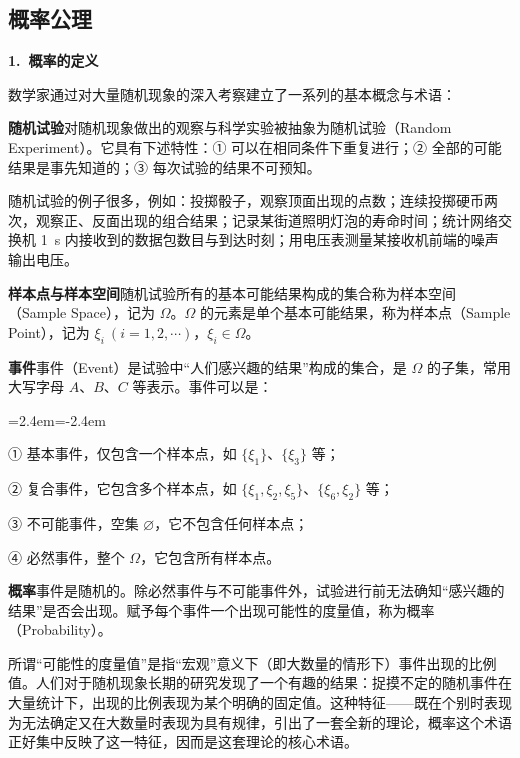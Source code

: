\documentclass[11pt,openany,UTF8]{ctexbook}
\newcommand{\bhead}[1]{\par\medskip\noindent\textbf{#1}\par\smallskip}
\newenvironment{citemize}
  {\begin{list}{}{\leftmargin=2.4em\itemindent=-2.4em\itemsep=1pt\topsep=3pt\parsep=0pt}}
  {\end{list}}
\begin{document}
\subsection{概率公理}
\bhead{1.\ 概率的定义}

数学家通过对大量随机现象的深入考察建立了一系列的基本概念与术语\nobreak：

\textbf{随机试验}\quad 对随机现象做出的观察与科学实验被抽象为随机试验（Random Experiment\nobreak）\nobreak。它具有下述特性\nobreak：① 可以在相同条件下重复进行\nobreak；② 全部的可能结果是事先知道的\nobreak；③ 每次试验的结果不可预知\nobreak。

随机试验的例子很多\nobreak，例如\nobreak：投掷骰子\nobreak，观察顶面出现的点数\nobreak；连续投掷硬币两次\nobreak，观察正\nobreak、反面出现的组合结果\nobreak；记录某街道照明灯泡的寿命时间\nobreak；统计网络交换机 1~s 内接收到的数据包数目与到达时刻\nobreak；用电压表测量某接收机前端的噪声输出电压\nobreak。

\textbf{样本点与样本空间}\quad 随机试验所有的基本可能结果构成的集合称为样本空间（Sample Space\nobreak）\nobreak，记为 $\Omega$\nobreak。$\Omega$ 的元素是单个基本可能结果\nobreak，称为样本点（Sample Point\nobreak）\nobreak，记为 $\xi_i\ (i=1,2,\cdots)$\nobreak，$\xi_i\in\Omega$\nobreak。

\textbf{事件}\quad 事件（Event\nobreak）是试验中“人们感兴趣的结果”构成的集合\nobreak，是 $\Omega$ 的子集\nobreak，常用大写字母 $A$\nobreak、$B$\nobreak、$C$ 等表示\nobreak。事件可以是\nobreak：

\begin{citemize}
  \item ① 基本事件\nobreak，仅包含一个样本点\nobreak，如 $\{\xi_1\}$\nobreak、$\{\xi_3\}$ 等\nobreak；
  \item ② 复合事件\nobreak，它包含多个样本点\nobreak，如 $\{\xi_1,\xi_2,\xi_5\}$\nobreak、$\{\xi_6,\xi_2\}$ 等\nobreak；
  \item ③ 不可能事件\nobreak，空集 $\varnothing$\nobreak，它不包含任何样本点\nobreak；
  \item ④ 必然事件\nobreak，整个 $\Omega$\nobreak，它包含所有样本点\nobreak。
\end{citemize}

\textbf{概率}\quad 事件是随机的\nobreak。除必然事件与不可能事件外\nobreak，试验进行前无法确知“感兴趣的结果”是否会出现\nobreak。赋予每个事件一个出现可能性的度量值\nobreak，称为概率（Probability\nobreak）\nobreak。

所谓“可能性的度量值”是指“宏观”意义下（即大数量的情形下\nobreak）事件出现的比例值\nobreak。人们对于随机现象长期的研究发现了一个有趣的结果\nobreak：捉摸不定的随机事件在大量统计下\nobreak，出现的比例表现为某个明确的固定值\nobreak。这种特征——既在个别时表现为无法确定又在大数量时表现为具有规律\nobreak，引出了一套全新的理论\nobreak，概率这个术语正好集中反映了这一特征\nobreak，因而是这套理论的核心术语\nobreak。
\end{document}
